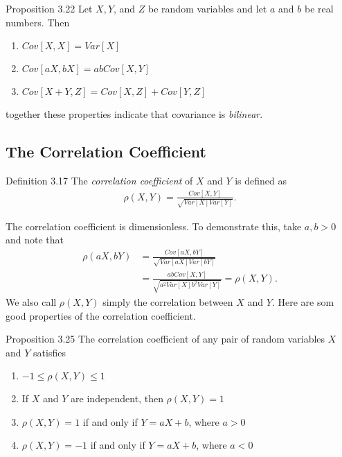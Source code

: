 \begin{boks}{Proposition 3.22}
  Let $X, Y$, and $Z$ be random variables and let $a$ and $b$ be real numbers. Then
  \begin{enumerate}
    \item $Cov[X, X] = Var[X]$
    \item $Cov[aX, bX] = abCov[X, Y]$
    \item $Cov[X + Y, Z] = Cov[X, Z] + Cov[Y, Z]$
  \end{enumerate}
  together these properties indicate that covariance is \textit{bilinear}.
\end{boks}

\subsection{The Correlation Coefficient}

\begin{boks}{Definition 3.17}
  The \textit{correlation coefficient} of $X$ and $Y$ is defined as
  \begin{align*}
    \rho(X, Y) = \frac{Cov[X, Y]}{\sqrt{Var[X]Var[Y]}}.
  \end{align*}
\end{boks}

The correlation coefficient is dimensionless. To demonstrate this, take $a, b > 0$ and note that
\begin{align*}
  \rho(aX, bY) &= \frac{Cov[aX, bY]}{\sqrt{Var[aX]Var[bY]}}\\
  &= \frac{abCov[X, Y]}{\sqrt{a^2Var[X]b^2Var[Y]}} = \rho(X, Y).
\end{align*}
We also call $\rho(X, Y)$ simply the correlation between $X$ and $Y$. Here are som good properties of the correlation coefficient.

\begin{boks}{Proposition 3.25}
  The correlation coefficient of any pair of random variables $X$ and $Y$ satisfies
  \begin{enumerate}
    \item $-1\leq\rho(X, Y)\leq1$
    \item If $X$ and $Y$ are independent, then $\rho(X, Y) = 1$
    \item $\rho(X, Y) = 1$ if and only if $Y = aX + b$,  where $a > 0$
    \item $\rho(X, Y) = -1$ if and only if $Y = aX + b$,  where $a < 0$
  \end{enumerate}
\end{boks}

